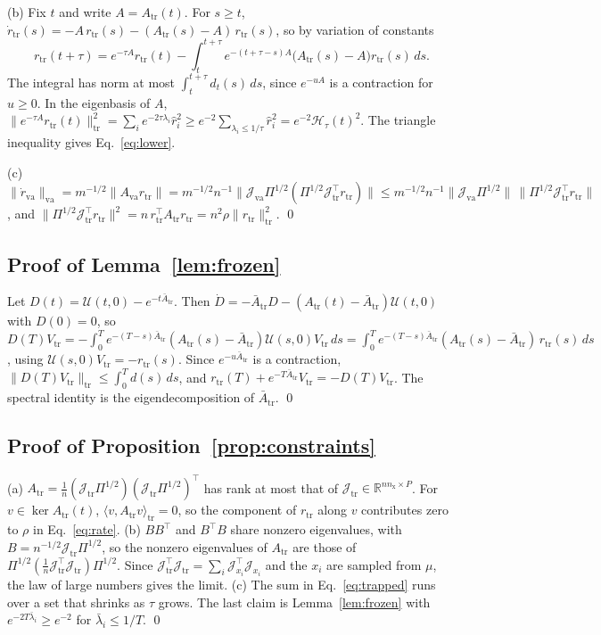 \documentclass[11pt]{article}
\theoremstyle{definition}
\theoremstyle{remark}
\newcommand{\R}{\mathbb{R}}
\newcommand{\Hard}{\mathcal{H}}
\newcommand{\tr}{\mathrm{tr}}
\newcommand{\va}{\mathrm{va}}
\newcommand{\Prop}{\mathcal{U}}
\newcommand{\Jac}{\mathcal{J}}
\begin{document}
(b) Fix $t$ and write $A = A_\tr(t)$.
For $s \ge t$, $\dot r_\tr(s) = -A\,r_\tr(s) - (A_\tr(s) - A)\,r_\tr(s)$, so by variation of constants
\begin{equation*}
r_\tr(t+\tau) = e^{-\tau A}r_\tr(t) - \int_t^{t+\tau}e^{-(t+\tau-s)A}\big(A_\tr(s) - A\big)r_\tr(s)\,ds .
\end{equation*}
The integral has norm at most $\int_t^{t+\tau}d_t(s)\,ds$, since $e^{-uA}$ is a contraction for $u \ge 0$.
In the eigenbasis of $A$, $\|e^{-\tau A}r_\tr(t)\|_\tr^2 = \sum_i e^{-2\tau\lambda_i}\hat r_i^2 \ge e^{-2}\sum_{\lambda_i\le1/\tau}\hat r_i^2 = e^{-2}\Hard_\tau(t)^2$.
The triangle inequality gives Eq.~\eqref{eq:lower}.

(c) $\|\dot r_\va\|_\va = m^{-1/2}\|A_\va r_\tr\| = m^{-1/2}n^{-1}\|\Jac_\va\Pi^{1/2}(\Pi^{1/2}\Jac_\tr^\top r_\tr)\| \le m^{-1/2}n^{-1}\|\Jac_\va\Pi^{1/2}\|\,\|\Pi^{1/2}\Jac_\tr^\top r_\tr\|$, and $\|\Pi^{1/2}\Jac_\tr^\top r_\tr\|^2 = n\,r_\tr^\top A_\tr r_\tr = n^2\rho\|r_\tr\|_\tr^2$. \qed

\subsection{Proof of Lemma~\ref{lem:frozen}}\label{app:frozen}
Let $D(t) = \Prop(t,0) - e^{-t\bar A_\tr}$.
Then $\dot D = -\bar A_\tr D - (A_\tr(t) - \bar A_\tr)\Prop(t,0)$ with $D(0) = 0$, so
$D(T)V_\tr = -\int_0^T e^{-(T-s)\bar A_\tr}(A_\tr(s) - \bar A_\tr)\Prop(s,0)V_\tr\,ds = \int_0^T e^{-(T-s)\bar A_\tr}(A_\tr(s) - \bar A_\tr)\,r_\tr(s)\,ds$,
using $\Prop(s,0)V_\tr = -r_\tr(s)$.
Since $e^{-u\bar A_\tr}$ is a contraction, $\|D(T)V_\tr\|_\tr \le \int_0^T d(s)\,ds$, and $r_\tr(T) + e^{-T\bar A_\tr}V_\tr = -D(T)V_\tr$.
The spectral identity is the eigendecomposition of $\bar A_\tr$. \qed

\subsection{Proof of Proposition~\ref{prop:constraints}}\label{app:constraints}
(a) $A_\tr = \tfrac1n(\Jac_\tr\Pi^{1/2})(\Jac_\tr\Pi^{1/2})^\top$ has rank at most that of $\Jac_\tr \in \R^{nn_{\mathrm x}\times P}$.
For $v \in \ker A_\tr(t)$, $\langle v, A_\tr v\rangle_\tr = 0$, so the component of $r_\tr$ along $v$ contributes zero to $\rho$ in Eq.~\eqref{eq:rate}.
(b) $BB^\top$ and $B^\top B$ share nonzero eigenvalues, with $B = n^{-1/2}\Jac_\tr\Pi^{1/2}$, so the nonzero eigenvalues of $A_\tr$ are those of $\Pi^{1/2}(\tfrac1n\Jac_\tr^\top\Jac_\tr)\Pi^{1/2}$.
Since $\Jac_\tr^\top\Jac_\tr = \sum_i\Jac_{x_i}^\top\Jac_{x_i}$ and the $x_i$ are sampled from $\mu$, the law of large numbers gives the limit.
(c) The sum in Eq.~\eqref{eq:trapped} runs over a set that shrinks as $\tau$ grows.
The last claim is Lemma~\ref{lem:frozen} with $e^{-2T\bar\lambda_i} \ge e^{-2}$ for $\bar\lambda_i \le 1/T$. \qed
\end{document}
